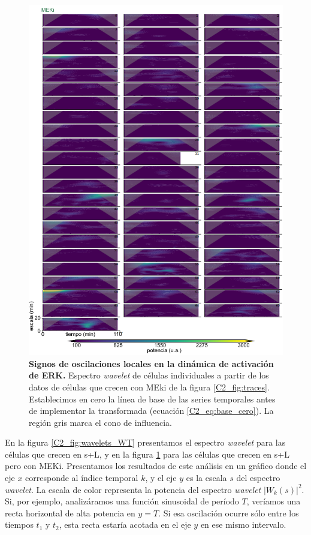 \documentclass[./main.tex]{subfiles}
\begin{document}
 \begin{figure}
    \centering
    \includegraphics[width=1\textwidth]{figures/chapter2/C2_wavelets_MEKi.pdf}\caption{\textbf{Signos de oscilaciones locales en la dinámica de activación de ERK.} Espectro \textit{wavelet} de células individuales a partir de los datos de células que crecen con MEki de la figura \ref{C2_fig:traces}. Establecimos en cero la línea de base de las series temporales antes de implementar la transformada (ecuación \ref{C2_eq:base_cero}). La región gris marca el cono de influencia.}
    \label{C2_fig:wavelets_MEKI}
\end{figure}


En la figura \ref{C2_fig:wavelets_WT} presentamos el espectro \textit{wavelet} para las células que crecen en s+L, y en la figura \ref{C2_fig:wavelets_MEKI} para las células que crecen en s+L pero con MEKi. Presentamos los resultados de este análisis en un gráfico donde el eje $x$ corresponde al índice temporal $k$, y el eje $y$ es la escala $s$ del espectro \textit{wavelet}. La escala de color representa la potencia del espectro \textit{wavelet} $|W_k(s)|^2$. Si, por ejemplo, analizáramos una función sinusoidal de período $T$, veríamos una recta horizontal de alta potencia en $y = T$. Si esa oscilación ocurre sólo entre los tiempos $t_1$ y $t_2$, esta recta estaría acotada en el eje $y$ en ese mismo intervalo.   
\end{document}
